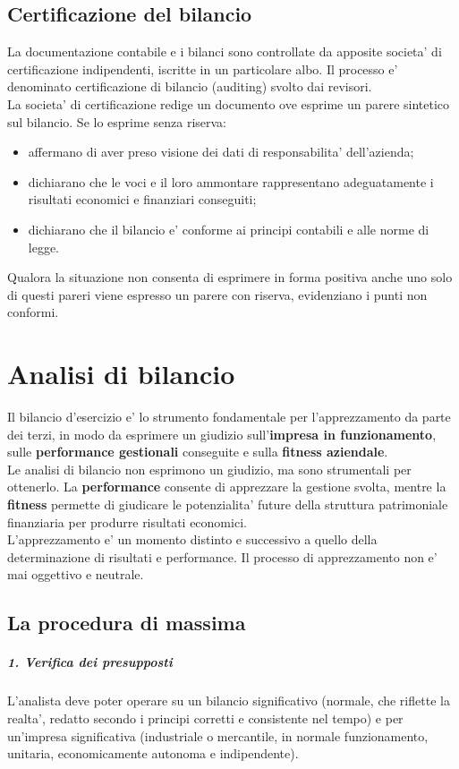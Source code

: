 \documentclass{report}
\begin{document}
	\section{Certificazione del bilancio}
	La documentazione contabile e i bilanci sono controllate da apposite societa' di certificazione indipendenti, iscritte in un particolare albo. Il processo e' denominato certificazione di bilancio (auditing) svolto dai revisori.
	\medskip \\La societa' di certificazione redige un documento ove esprime un parere sintetico sul bilancio. Se lo esprime senza riserva:
	\begin{itemize}
		\item affermano di aver preso visione dei dati di responsabilita' dell'azienda;
		\item dichiarano che le voci e il loro ammontare rappresentano adeguatamente i risultati economici e finanziari conseguiti;
		\item dichiarano che il bilancio e' conforme ai principi contabili e alle norme di legge.
	\end{itemize}
	Qualora la situazione non consenta di esprimere in forma positiva anche uno solo di questi pareri viene espresso un parere con riserva, evidenziano i punti non conformi.
	\chapter{Analisi di bilancio}
	Il bilancio d'esercizio e' lo strumento fondamentale per l'apprezzamento da parte dei terzi, in modo da esprimere un giudizio sull'\textbf{impresa in funzionamento}, sulle \textbf{performance gestionali} conseguite e sulla \textbf{fitness aziendale}.
	\medskip \\
	Le analisi di bilancio non esprimono un giudizio, ma sono strumentali per ottenerlo. La \textbf{performance} consente di apprezzare la gestione svolta, mentre la \textbf{fitness} permette di giudicare le potenzialita' future della struttura patrimoniale finanziaria per produrre risultati economici.
	\medskip \\
	L'apprezzamento e' un momento distinto e successivo a quello della determinazione di risultati e performance. Il processo di apprezzamento non e' mai oggettivo e neutrale.
	\section{La procedura di massima}
	\paragraph{1. Verifica dei presupposti} L'analista deve poter operare su un bilancio significativo (normale, che riflette la realta', redatto secondo i principi corretti e consistente nel tempo) e per un'impresa significativa (industriale o mercantile, in normale funzionamento, unitaria, economicamente autonoma e indipendente).
\end{document}
